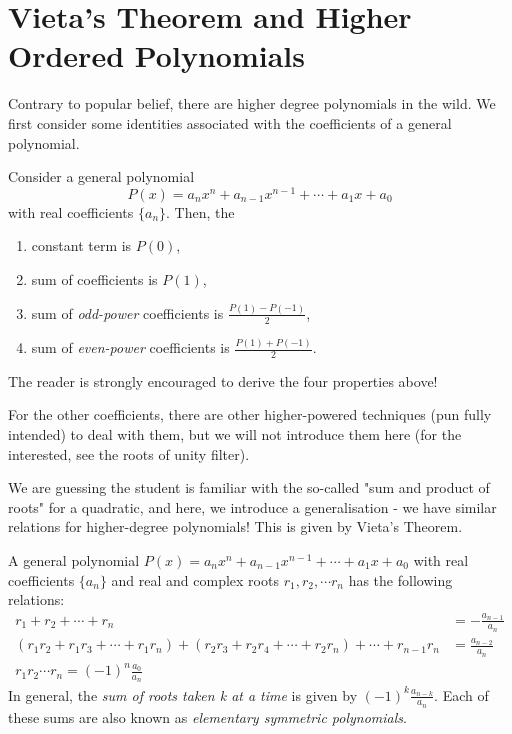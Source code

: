 \documentclass[../jarvis.tex]{subfiles}
\begin{document}
\section{Vieta's Theorem and Higher Ordered Polynomials \med}
Contrary to popular belief, there are higher degree polynomials in the wild. We first consider some identities associated with the coefficients of a general polynomial.

Consider a general polynomial $$P(x)=a_nx^n+a_{n-1}x^{n-1}+\cdots+a_1x+a_0$$ with real coefficients $\{a_n\}$. Then, the
\begin{enumerate}
    \item constant term is $P(0)$,
    \item sum of coefficients is $P(1)$,
    \item sum of \textit{odd-power} coefficients is $\frac{P(1)-P(-1)}{2}$,
    \item sum of \textit{even-power} coefficients is $\frac{P(1)+P(-1)}{2}$.
\end{enumerate}

The reader is strongly encouraged to derive the four properties above!

For the other coefficients, there are other higher-powered techniques (pun fully intended) to deal with them, but we will not introduce them here (for the interested, see the roots of unity filter).

We are guessing the student is familiar with the so-called "sum and product of roots" for a quadratic, and here, we introduce a generalisation - we have similar relations for higher-degree polynomials! This is given by Vieta's Theorem.

\begin{proposition}
    A general polynomial $P(x)=a_nx^n+a_{n-1}x^{n-1}+\cdots+a_1x+a_0$ with real coefficients $\{a_n\}$ and real and complex roots $r_1, r_2, \cdots r_n$ has the following relations:
    \begin{align*}
        r_1+r_2+\cdots+r_n&=-\frac{a_{n-1}}{a_n}\\
        (r_1r_2+r_1r_3+\cdots+r_1r_n)+(r_2r_3+r_2r_4+\cdots+r_2r_n)+\cdots+r_{n-1}r_n&=\frac{a_{n-2}}{a_n} \\
        r_1r_2\cdots r_n=(-1)^n\frac{a_0}{a_n}
    \end{align*}
    In general, the \textit{sum of roots taken k at a time} is given by $(-1)^k\frac{a_{n-k}}{a_n}.$ Each of these sums are also known as \textit{elementary symmetric polynomials}.
\end{proposition}
\end{document}

